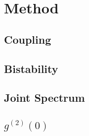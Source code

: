 \section{Method}
\subsection{Coupling}
\subsection{Bistability}
\subsection{Joint Spectrum}
\subsection{$g^{(2)}(0)$}
